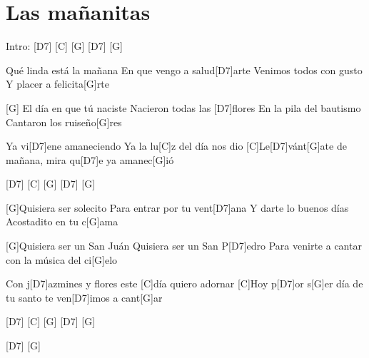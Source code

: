 \section{Las mañanitas}

\noindent
\chordDs
\chordC
\chordG

\vspace{1cm}

\begin{guitar}
	\begin{multicols}{2}
	
		Intro: \hspace{0.5cm} [D7] \hspace{0.5cm}[C] \hspace{0.5cm} [G] \hspace{0.5cm}[D7] \hspace{0.5cm} [G]
		
		\newline
		[G]Qué linda está la mañana
		En que vengo a salud[D7]arte
		Venimos todos con gusto
		Y placer a felicita[G]rte
		
		[G]
		El día en que tú naciste
		Nacieron todas las [D7]flores
		En la pila del bautismo
		Cantaron los ruiseño[G]res
		
		
		Ya vi[D7]ene amaneciendo
		Ya la lu[C]z del día nos dio
		[C]Le[D7]vánt[G]ate de mañana, mira qu[D7]e ya amanec[G]ió
			
		\vspace{0.1cm}
		
		[D7] \hspace{0.5cm}[C] \hspace{0.5cm} [G] \hspace{0.5cm}[D7] \hspace{0.5cm} [G]
		
		[G]Quisiera ser solecito
		Para entrar por tu vent[D7]ana
		Y darte lo buenos días
		Acostadito en tu c[G]ama
		
		[G]Quisiera ser un San Juán
		Quisiera ser un San P[D7]edro
		Para venirte a cantar 
		con la música del ci[G]elo
		
		Con j[D7]azmines y flores 
		este [C]día quiero adornar
		[C]Hoy p[D7]or s[G]er día de tu santo te ven[D7]imos a cant[G]ar
		
		\vspace{0.1cm}
		
		[D7] \hspace{0.5cm}[C] \hspace{0.5cm} [G] \hspace{0.5cm}[D7] \hspace{0.5cm} [G]
		
		[D7] \hspace{0.1cm}[G]

	\end{multicols}	
\end{guitar}
